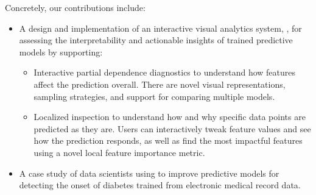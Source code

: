 Concretely, our contributions include:

\begin{itemize}
\item A design and implementation of an interactive visual analytics system,
\prospector, for assessing the interpretability and actionable insights of trained predictive models by supporting:
\begin{itemize}
    \item Interactive partial dependence diagnostics to understand how features affect the prediction overall. There are novel visual representations, sampling strategies, and support for comparing multiple models.
    \item Localized inspection to understand how and why specific data points are predicted as they are.  Users can interactively tweak feature values and see how the prediction responds, as well as find the most impactful features using a novel local feature importance metric.
  \end{itemize}
\item A case study of data scientists using
\prospector to improve predictive models for detecting the onset of diabetes trained from electronic medical record data.
\end{itemize}


